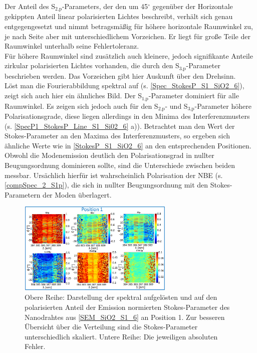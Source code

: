 Der Anteil des S$_\text{2,p}$-Parameters, der den um 45$^\circ$ gegenüber der Horizontale gekippten Anteil linear polarisierten Lichtes beschreibt, verhält sich genau entgegengesetzt und nimmt betragsmäßig für höhere horizontale Raumwinkel zu, je nach Seite aber mit unterschiedlichem Vorzeichen. Er liegt für große Teile der Raumwinkel unterhalb seine Fehlertoleranz.\\
Für höhere Raumwinkel sind zusätzlich auch kleinere, jedoch signifikante Anteile zirkular polarisierten Lichtes vorhanden, die durch den S$_\text{3,p}$-Parameter beschrieben werden. Das Vorzeichen gibt hier Auskunft über den Drehsinn.\\
Löst man die Fourierabbildung spektral auf (s. \autoref{Spec_StokesP_S1_SiO2_6}), zeigt sich auch hier ein ähnliches Bild. Der S$_\text{1,p}$-Parameter dominiert für alle Raumwinkel. Es zeigen sich jedoch auch für den S$_\text{2,p}$- und S$_\text{3,p}$-Parameter höhere Polarisationsgrade, diese liegen allerdings in den Minima des Interferenzmusters (s. \autoref{SpecP1_StokesP_Line_S1_Si02_6} a)). Betrachtet man den Wert der Stokes-Parameter an den Maxima des Interferenzmusters, so ergeben sich ähnliche Werte wie in \autoref{StokesP_S1_SiO2_6} an den entsprechenden Positionen. Obwohl die Modenemission deutlich den Polarisationsgrad in nullter Beugungsordnung dominieren sollte, sind die Unterschiede zwischen beiden messbar. Ursächlich hierfür ist wahrscheinlich Polarisation der NBE (s. \autoref{compSpec_2_S1p}), die sich in nullter Beugungsordnung mit den Stokes-Parametern der Moden überlagert.\begin{figure}[b]
\includegraphics[width=0.66\textwidth]{Bilder/SiO2/SpecP1_StokesP_S1_Si02_6}
\caption{Obere Reihe: Darstellung der spektral aufgelösten und auf den polarisierten Anteil der Emission normierten Stokes-Parameter des Nanodrahtes aus \autoref{SEM_SiO2_S1_6} an Position 1. Zur besseren Übersicht über die Verteilung sind die Stokes-Parameter unterschiedlich skaliert. Untere Reihe: Die jeweiligen absoluten Fehler.}
\label{Spec_StokesP_S1_SiO2_6}

\end{figure}
